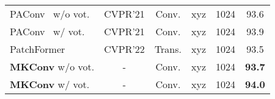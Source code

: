 \documentclass[preprint,12pt]{elsarticle}
\begin{document}
\begin{table*}[t]
\begin{center}
\begin{tabular}{l|cccc|c}
			PAConv~\citep{xu2021paconv} w/o vot.& CVPR'21& Conv. &   xyz&1024  & 93.6 \\
			PAConv~\citep{xu2021paconv} w/ vot. & CVPR'21& Conv. &   xyz&1024  & 93.9  \Bstrut\\
PatchFormer~\cite{zhang2022patchformer} & CVPR'22 & Trans. &  xyz&1024  & 93.5 \\
			\textbf{MKConv} w/o vot. & - & Conv.  &   xyz&1024  & \textbf{93.7} \\
			\textbf{MKConv} w/ vot.  & - & Conv.  &   xyz&1024   & \textbf{94.0}  \\
			\hline
		\end{tabular}
		\label{tab:cls}\end{center}
\end{table*}
\begin{comment}
\begin{table*}[t]
\begin{center}
\footnotesize
\caption{Object classification results (\%) on ModelNet40. ``nr'', ``vot.'', ``Oper.'', ``Conv.'' denote normal vectors, voting strategy, operation and convolution, respectively.}
\begin{tabular}{l|ccc|c}
\toprule
Method & Oper. & Input & \#points & OA  \\
\midrule
\midrule
SpiderCNN \citep{xu2018spidercnn} & Conv.    &  xyz, nr & 1024   & 92.4  \\
PointConv~\citep{wu2019pointconv} & Conv.     &  xyz, nr & 1024    & 92.5  \\
KPConv \citep{thomas2019kpconv}& Conv.     &  xyz & 6800   & 92.9 \\
SO-Net \citep{li2018so}  & MLP   &  xyz, nr & 5000     & 93.4 \\
\midrule
PointNet \citep{qi2017pointnet} & MLP    &  xyz & 1024  & 89.2 \\
PointNet++ \citep{qi2017pointnet++}  & MLP   &  xyz & 1024 & 90.7 \\
DGCNN~\citep{wang2019dynamic}  & MLP   &  xyz & 1024  & 92.2\\
DensePoint~\citep{liu2019densepoint} & MLP   &  xyz & 1024  & 93.2  \\
CurveNet~\citep{xiang2021walk} w/o vot. & MLP  &  xyz&1024  & \textbf{93.8}  \\
CurveNet~\citep{xiang2021walk} w/ vot. & MLP &  xyz&1024  & \textbf{94.2} \\
\midrule
PointCNN \citep{li2018pointcnn} & Conv.    &  xyz & 1024 & 92.2   \\
DenX-Conv~\cite{lee2021connectivity} & Conv.    &  xyz & 1024 & 92.5   \\

\end{comment}
\end{document}
